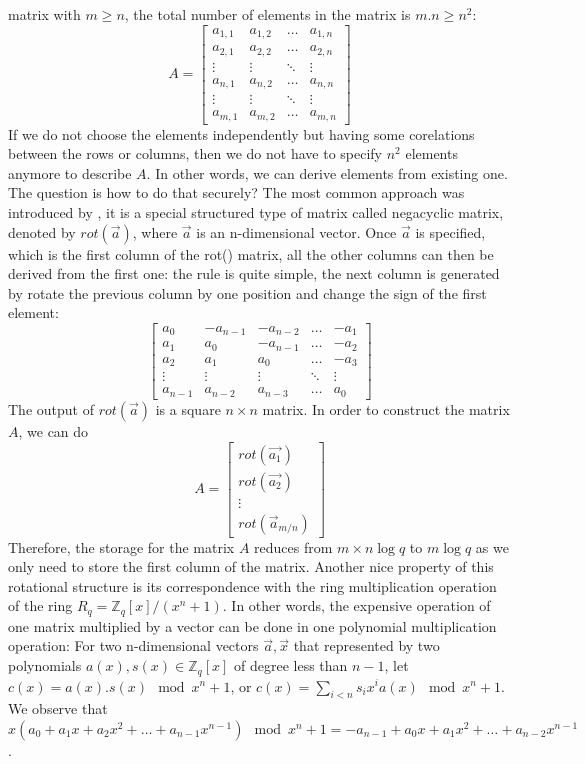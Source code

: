 \begin{description}
  matrix with $m \geq n$, the total number of elements in the matrix is
  $m.n \geq n^2$:
  \[
    A = \begin{bmatrix}
      a_{1,1}& a_{1,2}& \dots& a_{1,n}\\
      a_{2,1}& a_{2,2}& \dots& a_{2,n}\\
      \vdots& \vdots& \ddots& \vdots\\
      a_{n,1}& a_{n,2}& \dots& a_{n,n}\\
      \vdots& \vdots& \ddots& \vdots\\
      a_{m,1}& a_{m,2}& \dots& a_{m,n}
    \end{bmatrix}
  \]
  If we do not choose the elements independently but having some corelations
  between the rows or columns, then we do not have to specify $n^2$ elements
  anymore to describe $A$. In other words, we can derive elements from existing
  one. The question is how to do that securely? The most common approach was
  introduced by \cite{hoffstein1998ntru, micciancio2007generalized}, it is a
  special structured type of matrix called negacyclic matrix, denoted by
  $rot(\vec{a})$, where $\vec{a}$ is an n-dimensional vector. Once $\vec{a}$ is
  specified, which is the first column of the rot() matrix, all the other
  columns can then be derived from the first one: the rule is quite simple, the
  next column is generated by rotate the previous column by one position and
  change the sign of the first element:
  \[
    \begin{bmatrix}
      a_{0}& -a_{n-1}& -a_{n-2}& \dots& -a_1\\
      a_1& a_0& -a_{n-1}& \dots& -a_2\\
      a_2& a_1& a_0& \dots& -a_3\\
      \vdots& \vdots& \vdots& \ddots& \vdots\\
      a_{n-1}& a_{n-2}& a_{n-3}& \dots& a_0
    \end{bmatrix}
  \]
  The output of $rot(\vec{a})$ is a square $n \times n$ matrix. In order to
  construct the matrix $A$, we can do
  \[
    A = \begin{bmatrix}
      rot(\vec{a_1})\\
      rot(\vec{a_2})\\
      \vdots\\
      rot(\vec{a}_{m/n})
    \end{bmatrix}
  \]
  Therefore, the storage for the matrix $A$ reduces from $m \times n \log q$ to
  $m \log q$ as we only need to store the first column of the matrix.  Another
  nice property of this rotational structure is its correspondence with the ring
  multiplication operation of the ring $R_q = \mathbb{Z}_q[x]/(x^n+1)$. In other
  words, the expensive operation of one matrix multiplied by a vector can be
  done in one polynomial multiplication operation: For two n-dimensional vectors
  $\vec{a}, \vec{x}$ that represented by two polynomials
  $a(x), s(x) \in \mathbb{Z}_q[x]$ of degree less than $n -1$, let
  $c(x) = a(x).s(x) \mod x^n + 1$, or
  $c(x) = \sum_{i<n}s_ix^ia(x) \mod x^n + 1$. We observe that
  $x(a_0 + a_1x + a_2x^2 + \dots + a_{n-1}x^{n-1}) \mod x^n + 1 =-a_{n-1} + a_0x
  + a_1x^2 + \dots + a_{n-2}x^{n-1}$.


\end{description}
